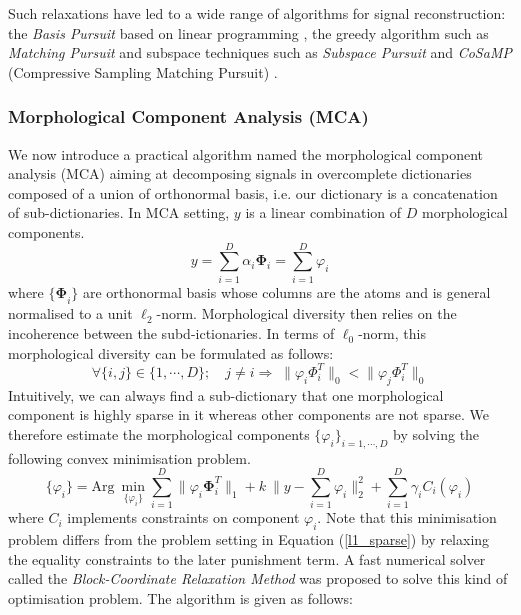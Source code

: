 Such relaxations have led to a wide range of algorithms for signal reconstruction: the \textit{Basis Pursuit} based on linear programming  \cite{BPAtomicDcomp}, the greedy algorithm such as \textit{Matching Pursuit} \cite{Mallat_Zhang1993} and subspace techniques such as \textit{Subspace Pursuit} \cite{WdaiSP} and \textit{CoSaMP} (Compressive
Sampling Matching Pursuit) \cite{CoSaMP2008}.


\subsubsection{Morphological Component Analysis (MCA)}
We now introduce a practical algorithm named the morphological component analysis (MCA) aiming at decomposing signals in overcomplete dictionaries composed of a union of orthonormal basis, i.e. our dictionary is a concatenation of sub-dictionaries. In MCA setting, $y$ is a linear combination of $D$ morphological components. 
\begin{equation}
    y = \sum_{i=1}^D  \alpha_i \mathbf{\Phi}_i = \sum_{i=1}^D \varphi_i
    \label{Eq_dictionary}
\end{equation}
where $\mathbf{\{\Phi}_i\}$ are orthonormal basis whose columns are the atoms and is general normalised to a unit $\ell_2$-norm. Morphological diversity then relies on the incoherence between the subd-ictionaries. In terms of $\ell_0$-norm, this morphological diversity can be formulated as follows:
\begin{equation}
    \forall\{i,j\} \in \{1,\cdots,D\};\quad j \neq i \Rightarrow \; \lVert \varphi_i \Phi_i^T \rVert_0 < \lVert \varphi_j \Phi_i^T \rVert_0
\end{equation}
Intuitively, we can always find a sub-dictionary that one morphological component is highly sparse in it whereas other components are not sparse. We therefore estimate the morphological components $\{\varphi_i\}_{i=1,\cdots,D}$ by solving the following convex minimisation problem.
\begin{equation}
    \{\varphi_i\} = \text{Arg} \: \min_{\{\varphi_i\}}\sum_{i=1}^D \lVert\varphi_i \mathbf{\Phi}_i^T \rVert_{1} + k \:\lVert y-\sum_{i=1}^D\varphi_i \rVert^2_2 +  \sum_{i=1}^D \gamma_i C_i (\varphi_i)
    \label{MCAequation}
\end{equation}
where $C_i$ implements constraints on component $\varphi_i$. Note that this minimisation problem differs from the problem setting in Equation (\ref{l1_sparse}) by relaxing the equality constraints to the later punishment term. A fast numerical solver called the \textit{Block-Coordinate Relaxation Method} \cite{BlockCoordinateMethod} was proposed to solve this kind of optimisation problem. 
The algorithm is given as follows:

